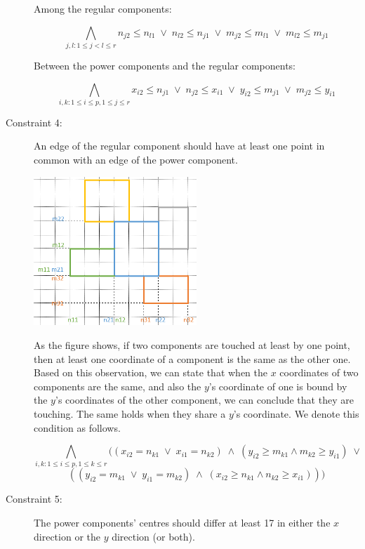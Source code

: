 \begin{description}
  Among the regular components:

  \[  \bigwedge_{j,l: 1 \leq j < l \leq r}
  n_{j2} \leq n_{l1} \; \vee \; n_{l2} \leq n_{j1} \; \vee \; m_{j2} \leq m_{l1} \; \vee \; m_{l2} \leq m_{j1}  \]

  Between the power components and the regular components:

  \[  \bigwedge_{i,k: 1 \leq i \leq p, 1 \leq j \leq r}
   x_{i2} \leq n_{j1} \; \vee \; n_{j2} \leq x_{i1} \; \vee \; y_{i2} \leq m_{j1} \; \vee \; m_{j2} \leq y_{i1} \]

  \item[Constraint 4:] An edge of the regular component should have at least one point in common with an edge of the power component.

\begin{center}
\includegraphics[width=0.5\textwidth]{Part1_2_2.png}
\end{center}

  As the figure shows, if two components are touched at least by one point, then at least one coordinate of a component is the same as the other one. Based on this observation, we can state that when the $x$ coordinates of two components are the same, and also the $y$'s coordinate of one is bound by the $y$'s coordinates of the other component, we can conclude that they are touching. The same holds when they share a $y$'s coordinate. We denote this condition as follows.

  \[  \bigwedge_{i,k: 1 \leq i \leq p, 1 \leq k \leq r}
  ((x_{i2} = n_{k1} \; \vee \; x_{i1} = n_{k2}) \; \wedge \;
  (y_{i2} \geq m_{k1} \wedge m_{k2} \geq y_{i1}) \; \vee \; \]
  \[  ((y_{i2} = m_{k1} \; \vee \; y_{i1} = m_{k2}) \; \wedge \;
  (x_{i2} \geq n_{k1} \wedge n_{k2} \geq x_{i1}))) \]

  \item[Constraint 5:] The power components' centres should differ at least 17 in either the $x$ direction or the $y$ direction (or both).


\end{description}
